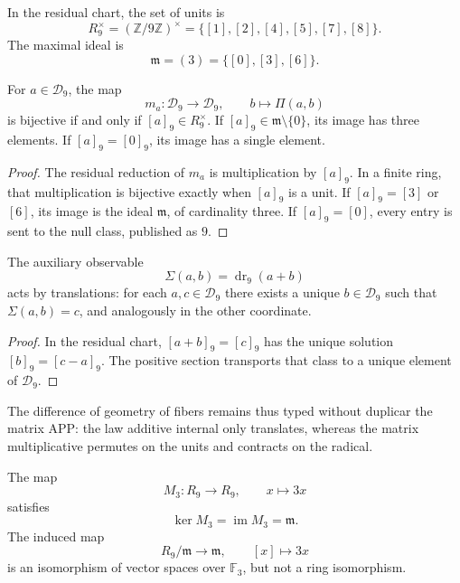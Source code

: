 In the residual chart, the set of units is
\[
 R_9^\times=(\mathbb Z/9\mathbb Z)^\times
   =\{[1],[2],[4],[5],[7],[8]\}.
\]
The maximal ideal is
\[
 \mathfrak m=(3)=\{[0],[3],[6]\}.
\]

\begin{theorem}
\label{p12-83-c1-s1:thm:app-clasificacion-filas-producto}
For \(a\in\mathcal D_9\), the map
\[
 m_a:\mathcal D_9\longrightarrow\mathcal D_9,
 \qquad b\longmapsto\Pi(a,b)
\]
is bijective if and only if \([a]_9\in R_9^\times\). If
\([a]_9\in\mathfrak m\setminus\{0\}\), its image has three elements. If
\([a]_9=[0]_9\), its image has a single element.
\end{theorem}

\begin{proof}
The residual reduction of \(m_a\) is multiplication by \([a]_9\). In a
finite ring, that multiplication is bijective exactly when \([a]_9\)
is a unit. If \([a]_9=[3]\) or \([6]\), its image is the ideal
\(\mathfrak m\), of cardinality three. If \([a]_9=[0]\), every entry is sent
to the null class, published as \(9\).
\end{proof}

\begin{proposition}
\label{p12-83-c1-s1:prop:app-latinidad-aditiva}
The auxiliary observable
\[
 \Sigma(a,b)=\operatorname{dr}_9(a+b)
\]
acts by translations: for each \(a,c\in\mathcal D_9\) there exists a unique
\(b\in\mathcal D_9\) such that \(\Sigma(a,b)=c\), and analogously in the other
coordinate.
\end{proposition}

\begin{proof}
In the residual chart, \([a+b]_9=[c]_9\) has the unique solution
\([b]_9=[c-a]_9\). The positive section transports that class to a unique
element of \(\mathcal D_9\).
\end{proof}

The difference of geometry of fibers remains thus typed without duplicar the matrix
APP: the law additive internal only translates, whereas the matrix multiplicative
permutes on the units and contracts on the radical.

\begin{proposition}
\label{p12-83-c1-s1:prop:app-radical-lineal}
The map
\[
 M_3:R_9\longrightarrow R_9,
 \qquad x\longmapsto3x
\]
satisfies
\[
 \ker M_3=\operatorname{im}M_3=\mathfrak m.
\]
The induced map
\[
 R_9/\mathfrak m\longrightarrow\mathfrak m,
 \qquad [x]\longmapsto3x
\]
is an isomorphism of vector spaces over \(\mathbb F_3\), but not a
ring isomorphism.
\end{proposition}

